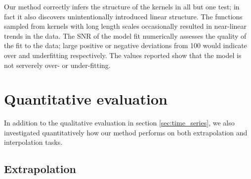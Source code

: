 \documentclass[twoside]{article}
\begin{document}
Our method correctly infers the structure of the kernels in all but one test; in fact it also discovers unintentionally introduced linear structure. 
The functions sampled from \kSE{} kernels with long length scales occasionally resulted in near-linear trends in the data.
The SNR of the model fit numerically assesses the quality of the fit to the data; large positive or negative deviations from 100 would indicate over and underfitting respectively.
The values reported show that the model is not serverely over- or under-fitting.







\section{Quantitative evaluation}
\label{sec:quantitative}

In addition to the qualitative evaluation in section \ref{sec:time_series}, we also investigated quantitatively how our method performs on both extrapolation and interpolation tasks.

\subsection{Extrapolation}
\end{document}
